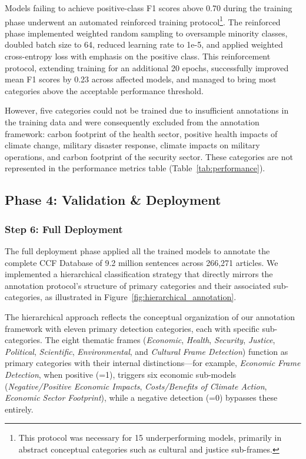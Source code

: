 Models failing to achieve positive-class F1 scores above 0.70 during the training phase underwent an automated reinforced training protocol\footnote{This protocol was necessary for 15 underperforming models, primarily in abstract conceptual categories such as cultural and justice sub-frames.}. The reinforced phase implemented weighted random sampling to oversample minority classes, doubled batch size to 64, reduced learning rate to 1e-5, and applied weighted cross-entropy loss with emphasis on the positive class. This reinforcement protocol, extending training for an additional 20 epochs, successfully improved mean F1 scores by 0.23 across affected models, and managed to bring most categories above the acceptable performance threshold.

However, five categories could not be trained due to insufficient annotations in the training data and were consequently excluded from the annotation framework: carbon footprint of the health sector, positive health impacts of climate change, military disaster response, climate impacts on military operations, and carbon footprint of the security sector. These categories are not represented in the performance metrics table (Table~\ref{tab:performance}).

\subsection{Phase 4: Validation \& Deployment}

\subsubsection{Step 6: Full Deployment}

The full deployment phase applied all the trained models to annotate the complete CCF Database of 9.2 million sentences across 266,271 articles. We implemented a hierarchical classification strategy that directly mirrors the annotation protocol's structure of primary categories and their associated sub-categories, as illustrated in Figure~\ref{fig:hierarchical_annotation}. 

The hierarchical approach reflects the conceptual organization of our annotation framework with eleven primary detection categories, each with specific sub-categories. The eight thematic frames (\emph{Economic}, \emph{Health}, \emph{Security}, \emph{Justice}, \emph{Political}, \emph{Scientific}, \emph{Environmental}, and \emph{Cultural Frame Detection}) function as primary categories with their internal distinctions—for example, \emph{Economic Frame Detection}, when positive (=1), triggers six economic sub-models (\emph{Negative/Positive Economic Impacts}, \emph{Costs/Benefits of Climate Action}, \emph{Economic Sector Footprint}), while a negative detection (=0) bypasses these entirely. 


